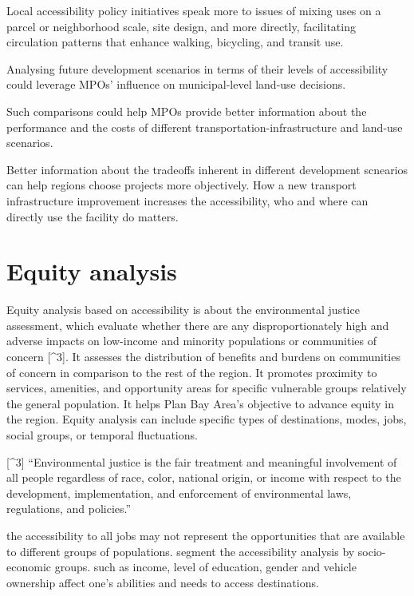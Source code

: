 \documentclass[12pt,]{article}
\begin{document}
Local accessibility policy initiatives speak more to issues of mixing
uses on a parcel or neighborhood scale, site design, and more directly,
facilitating circulation patterns that enhance walking, bicycling, and
transit use.

Analysing future development scenarios in terms of their levels of
accessibility could leverage MPOs' influence on municipal-level land-use
decisions.

Such comparisons could help MPOs provide better information about the
performance and the costs of different transportation-infrastructure and
land-use scenarios.

Better information about the tradeoffs inherent in different development
scnearios can help regions choose projects more objectively. How a new
transport infrastructure improvement increases the accessibility, who
and where can directly use the facility do matters.

\hypertarget{equity-analysis}{%
\section{Equity analysis}\label{equity-analysis}}

Equity analysis based on accessibility is about the environmental
justice assessment, which evaluate whether there are any
disproportionately high and adverse impacts on low-income and minority
populations or communities of concern {[}\^{}3{]}. It assesses the
distribution of benefits and burdens on communities of concern in
comparison to the rest of the region. It promotes proximity to services,
amenities, and opportunity areas for specific vulnerable groups
relatively the general population. It helps Plan Bay Area's objective to
advance equity in the region. Equity analysis can include specific types
of destinations, modes, jobs, social groups, or temporal fluctuations.

{[}\^{}3{]} ``Environmental justice is the fair treatment and meaningful
involvement of all people regardless of race, color, national origin, or
income with respect to the development, implementation, and enforcement
of environmental laws, regulations, and policies.''

the accessibility to all jobs may not represent the opportunities that
are available to different groups of populations. segment the
accessibility analysis by socio-economic groups. such as income, level
of education, gender and vehicle ownership affect one's abilities and
needs to access destinations.
\end{document}
